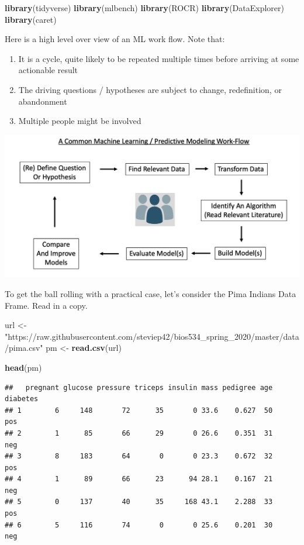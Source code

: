 \documentclass[
]{book}
\newenvironment{Shaded}{\begin{snugshade}}{\end{snugshade}}
\newcommand{\KeywordTok}[1]{\textcolor[rgb]{0.13,0.29,0.53}{\textbf{#1}}}
\newcommand{\NormalTok}[1]{#1}
\newcommand{\StringTok}[1]{\textcolor[rgb]{0.31,0.60,0.02}{#1}}
\providecommand{\tightlist}{%
  \setlength{\itemsep}{0pt}\setlength{\parskip}{0pt}}
\begin{document}
\begin{Shaded}
\begin{Highlighting}[]
\KeywordTok{library}\NormalTok{(tidyverse)}
\KeywordTok{library}\NormalTok{(mlbench)}
\KeywordTok{library}\NormalTok{(ROCR)}
\KeywordTok{library}\NormalTok{(DataExplorer)}
\KeywordTok{library}\NormalTok{(caret)}
\end{Highlighting}
\end{Shaded}

Here is a high level over view of an ML work flow. Note that:

\begin{enumerate}
\def\labelenumi{\arabic{enumi})}
\tightlist
\item
  It is a cycle, quite likely to be repeated multiple times before arriving at some actionable result
\item
  The driving questions / hypotheses are subject to change, redefinition, or abandonment
\item
  Multiple people might be involved
\end{enumerate}

\includegraphics{./PICS/flowwork1.png}

To get the ball rolling with a practical case, let's consider the Pima Indians Data Frame. Read in a copy.

\begin{Shaded}
\begin{Highlighting}[]
\NormalTok{url <-}\StringTok{ "https://raw.githubusercontent.com/steviep42/bios534_spring_2020/master/data/pima.csv"}
\NormalTok{pm <-}\StringTok{ }\KeywordTok{read.csv}\NormalTok{(url)}

\KeywordTok{head}\NormalTok{(pm)}
\end{Highlighting}
\end{Shaded}

\begin{verbatim}
##   pregnant glucose pressure triceps insulin mass pedigree age diabetes
## 1        6     148       72      35       0 33.6    0.627  50      pos
## 2        1      85       66      29       0 26.6    0.351  31      neg
## 3        8     183       64       0       0 23.3    0.672  32      pos
## 4        1      89       66      23      94 28.1    0.167  21      neg
## 5        0     137       40      35     168 43.1    2.288  33      pos
## 6        5     116       74       0       0 25.6    0.201  30      neg
\end{verbatim}
\end{document}
